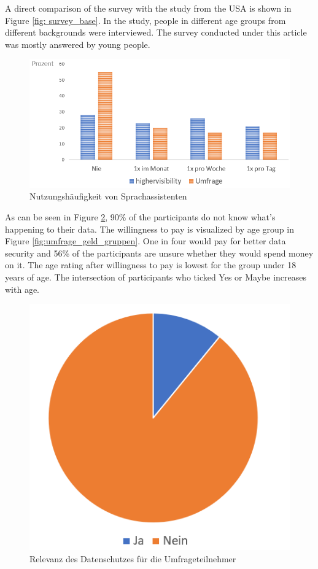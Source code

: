 A direct comparison of the survey with the study from the USA is shown in Figure \ref{fig: survey_base}. In the study, people in different age groups from different backgrounds were interviewed. The survey conducted under this article was mostly answered by young people.
\begin{figure}[h]
	\centering
	\includegraphics[width=0.9\linewidth]{Picture/umfrage_haeufigkeit}
	\caption[Nutzungshäufigkeit von Sprachassistenten]{Nutzungshäufigkeit von Sprachassistenten}
	\label{fig:umfrage_haeufigkeit}
\end{figure} 

As can be seen in Figure \ref{fig:umfrage_datenschutz}, 90\% of the participants do not know what's happening to their data. The willingness to pay is visualized by age group in Figure \ref{fig:umfrage_geld_gruppen}. One in four would pay for better data security and 56\% of the participants are unsure whether they would spend money on it. The age rating after willingness to pay is lowest for the group under 18 years of age. The intersection of participants who ticked \glqq Yes\grqq{} or \glqq Maybe\grqq{} increases with age.

\begin{figure}[h]
	\centering
	\includegraphics[width=0.5\linewidth]{Picture/umfrage_datenschutz}
	\caption[Relevanz des Datenschutzes für die Umfrageteilnehmer]{Relevanz des Datenschutzes für die Umfrageteilnehmer}
	\label{fig:umfrage_datenschutz}
\end{figure}

